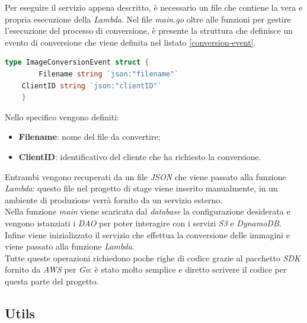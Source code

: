 Per eseguire il servizio appena descritto, è necessario un file che contiene la
vera e propria esecuzione della \emph{Lambda}. Nel file \emph{main.go} oltre
alle funzioni per gestire l'esecuzione del processo di conversione, è presente
la struttura che definisce un evento di conversione che viene definita nel
listato \ref{conversion-event}.
\begin{lstlisting}[label=conversion-event,caption={Struttura di un evento di conversione},captionpos=b, language=go]
    type ImageConversionEvent struct {
        Filename string `json:"filename"`
	ClientID string `json:"clientID"`
    }
\end{lstlisting}

Nello specifico vengono definiti:
\begin{itemize}
      \item \textbf{Filename}: nome del file da convertire;
      \item \textbf{ClientID}: identificativo del cliente che ha richiesto la
            conversione.
\end{itemize}
Entrambi vengono recuperati da un file \emph{JSON} che viene passato alla
funzione \emph{Lambda}: questo file nel progetto di stage viene inserito
manualmente, in un ambiente di produzione verrà fornito da un servizio
esterno.\\
Nella funzione \emph{main} viene scaricata dal \emph{database} la configurazione desiderata e
vengono istanziati i \emph{DAO} per poter
interagire con i servizi \emph{S3} e \emph{DynamoDB}. Infine viene
inizializzato il servizio che effettua la conversione delle immagini e viene
passato alla funzione \emph{Lambda}. \\
Tutte queste operazioni richiedono poche righe di codice grazie al pacchetto
\emph{SDK} fornito da \emph{AWS} per \emph{Go}: è stato molto semplice e diretto
scrivere il codice per questa parte del progetto.


\subsection{Utils}


